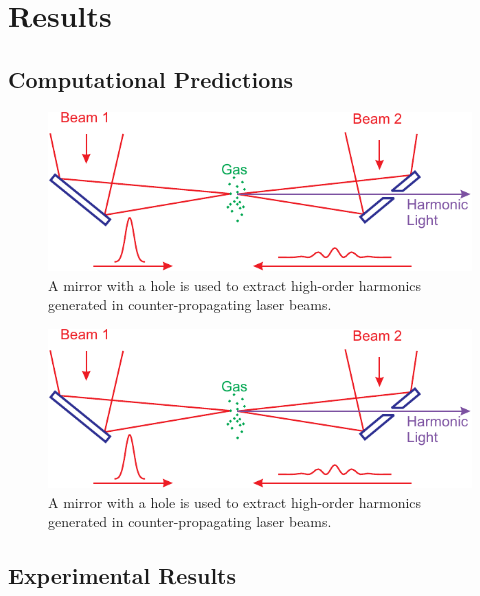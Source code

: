 \documentclass[oneside, astronomy, noacknowlegments]{BYUPhys}
\begin{document}
\section{}

\chapter{Results}
\section{Computational Predictions}

\begin{figure}
    \centerline{\includegraphics{Graphic1}}
    \caption[ODMR computational model for SiC]{\label{fig:SiCModel}
     A mirror with a hole is used to extract high-order harmonics generated in
     counter-propagating laser beams.}
 \end{figure}

\begin{figure}
    \centerline{\includegraphics{Graphic1}}
    \caption[ODMR computational model for CdTe]{\label{fig:CdTeModel}
     A mirror with a hole is used to extract high-order harmonics generated in
     counter-propagating laser beams.}
 \end{figure}

\section{Experimental Results}
\end{document}
